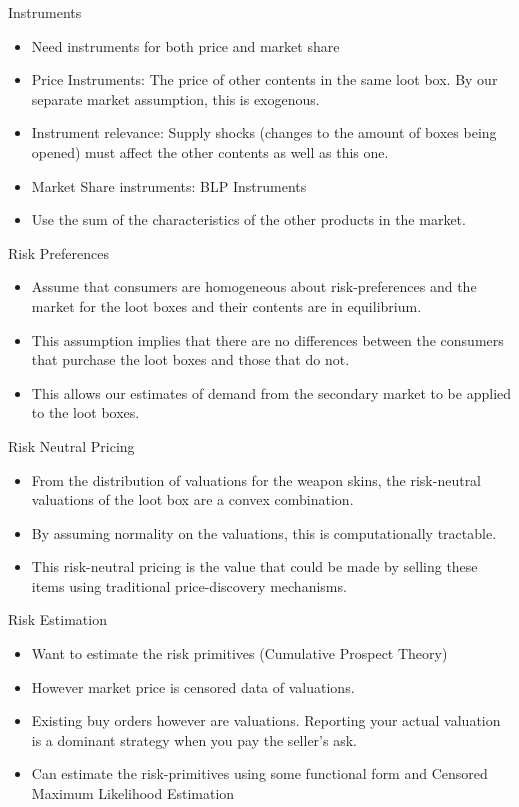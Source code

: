 \documentclass[bigger]{beamer}
\begin{document}
\begin{frame}[label={sec:orgc760841}]{Instruments}
\begin{itemize}
\item Need instruments for both price and market share
\item Price Instruments: The price of other contents in the same loot
box. By our separate market assumption, this is exogenous.
\item Instrument relevance: Supply shocks (changes to the amount of boxes
being opened) must affect the other contents as well as this one.
\item Market Share instruments: BLP Instruments
\item Use the sum of the characteristics of the other products in the
market.
\end{itemize}
\end{frame}

\begin{frame}[label={sec:orga1a6e82}]{Risk Preferences}
\begin{itemize}
\item Assume that consumers are homogeneous about risk-preferences and the
market for the loot boxes and their contents are in equilibrium.
\item This assumption implies that there are no differences between the
consumers that purchase the loot boxes and those that do not.
\item This allows our estimates of demand from the secondary market to be
applied to the loot boxes.
\end{itemize}
\end{frame}

\begin{frame}[label={sec:orgb3bfd8f}]{Risk Neutral Pricing}
\begin{itemize}
\item From the distribution of valuations for the weapon skins, the
risk-neutral valuations of the loot box are a convex combination.
\item By assuming normality on the valuations, this is computationally
tractable.
\item This risk-neutral pricing is the value that could be made by selling
these items using traditional price-discovery mechanisms.
\end{itemize}
\end{frame}

\begin{frame}[label={sec:org4b18620}]{Risk Estimation}
\begin{itemize}
\item Want to estimate the risk primitives (Cumulative Prospect Theory)
\item However market price is censored data of valuations.
\item Existing buy orders however are valuations. Reporting your actual
valuation is a dominant strategy when you pay the seller's ask.
\item Can estimate the risk-primitives using some functional form and
Censored Maximum Likelihood Estimation
\end{itemize}
\end{frame}
\end{document}
